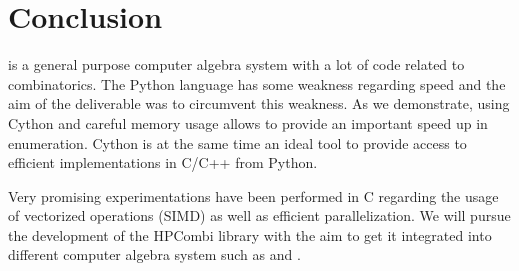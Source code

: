 \documentclass{deliverablereport}
\begin{document}

\section{Conclusion}
\Sage is a general purpose computer algebra system with a lot of code related
to combinatorics. The Python language has some weakness regarding speed and the
aim of the deliverable was to circumvent this weakness. As we demonstrate,
using Cython and careful memory usage allows to provide an
important speed up in enumeration. Cython is at the same time an ideal
tool to provide access to efficient implementations in C/C++ from Python.

Very promising experimentations have been performed in C regarding the usage
of vectorized operations (SIMD) as well as efficient parallelization. We will
pursue the development of the HPCombi library with the aim to get it
integrated into different computer algebra system such as \Sage and \GAP.

\printbibliography
\end{document}
